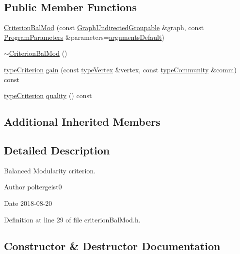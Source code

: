 \subsection*{Public Member Functions}
\begin{DoxyCompactItemize}
\item 
\hyperlink{classCriterionBalMod_a2ac41e4b98142642daaeff16f87fd1b8}{Criterion\+Bal\+Mod} (const \hyperlink{classGraphUndirectedGroupable}{Graph\+Undirected\+Groupable} \&graph, const \hyperlink{structProgramParameters}{Program\+Parameters} \&parameters=\hyperlink{program_8h_ae2d819404495f80f31db7676c1329d19}{arguments\+Default})
\item 
\hyperlink{classCriterionBalMod_a7b436498c68a76ecd7adecc9280900d0}{$\sim$\+Criterion\+Bal\+Mod} ()
\item 
\hyperlink{criterionInterface_8h_af71ff22f6355fd69a4a62104bfd59a83}{type\+Criterion} \hyperlink{classCriterionBalMod_acf5001622eb8c495a5d5e8f044c22395}{gain} (const \hyperlink{edge_8h_a5fbd20c46956d479cb10afc9855223f6}{type\+Vertex} \&vertex, const \hyperlink{graphUndirectedGroupable_8h_a914da95c9ea7f14f4b7f875c36818556}{type\+Community} \&comm) const
\item 
\hyperlink{criterionInterface_8h_af71ff22f6355fd69a4a62104bfd59a83}{type\+Criterion} \hyperlink{classCriterionBalMod_a87c0ccb5e2a851420dc82bd23cc31716}{quality} () const
\end{DoxyCompactItemize}
\subsection*{Additional Inherited Members}


\subsection{Detailed Description}
Balanced Modularity criterion. 

\begin{DoxyAuthor}{Author}
poltergeist0
\end{DoxyAuthor}
\begin{DoxyDate}{Date}
2018-\/08-\/20 
\end{DoxyDate}


Definition at line 29 of file criterion\+Bal\+Mod.\+h.



\subsection{Constructor \& Destructor Documentation}
\mbox{\label{classCriterionBalMod_a2ac41e4b98142642daaeff16f87fd1b8}} 
